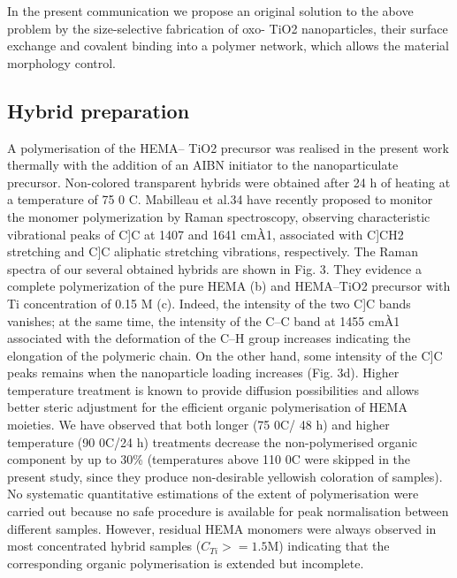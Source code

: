 In the present communication we propose an original solution
to the above problem by the size-selective fabrication of oxo-
TiO2 nanoparticles, their surface exchange and covalent binding
into a polymer network, which allows the material morphology
control.


\subsection{Hybrid preparation}
A polymerisation of the HEMA–
TiO2 precursor was realised in the present work thermally with
the addition of an AIBN initiator to the nanoparticulate
precursor. Non-colored transparent hybrids were obtained after
24 h of heating at a temperature of 75 0 C. Mabilleau et al.34 have
recently proposed to monitor the monomer polymerization by
Raman spectroscopy, observing characteristic vibrational peaks
of C]C at 1407 and 1641 cmÀ1, associated with C]CH2
stretching and C]C aliphatic stretching vibrations, respectively.
The Raman spectra of our several obtained hybrids are shown in
Fig. 3. They evidence a complete polymerization of the pure
HEMA (b) and HEMA–TiO2 precursor with Ti concentration of
0.15 M (c). Indeed, the intensity of the two C]C bands vanishes;
at the same time, the intensity of the C–C band at 1455 cmÀ1
associated with the deformation of the C–H group increases
indicating the elongation of the polymeric chain. On the other
hand, some intensity of the C]C peaks remains when the
nanoparticle loading increases (Fig. 3d). Higher temperature
treatment is known to provide diffusion possibilities and allows
better steric adjustment for the efficient organic polymerisation
of HEMA moieties. We have observed that both longer (75 0C/
48 h) and higher temperature (90 0C/24 h) treatments decrease
the non-polymerised organic component by up to 30\%
(temperatures above 110  0C were skipped in the present study,
since they produce non-desirable yellowish coloration of
samples). No systematic quantitative estimations of the extent of
polymerisation were carried out because no safe procedure is
available for peak normalisation between different samples.
However, residual HEMA monomers were always observed in
most concentrated hybrid samples ($C_{Ti} >= 1.5$M) indicating that
the corresponding organic polymerisation is extended but
incomplete.


